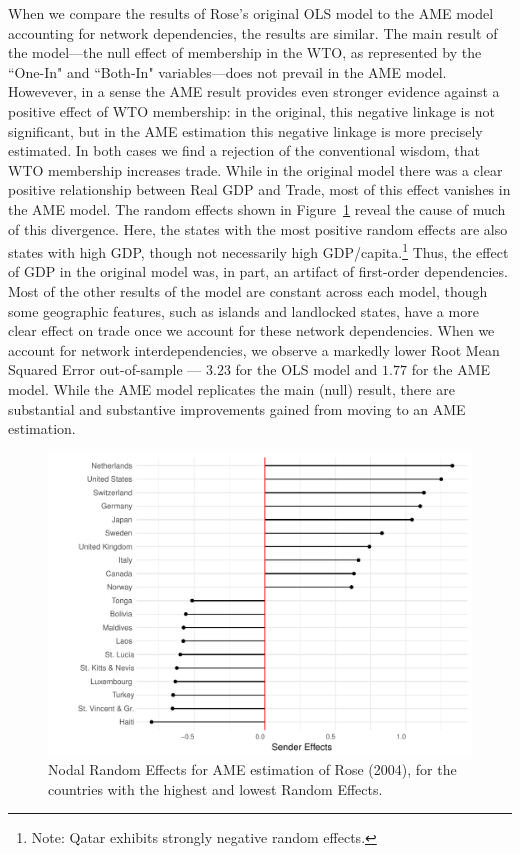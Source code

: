 When we compare the results of Rose's original OLS model to the AME model accounting for network dependencies, the results are similar. The main result of the model---the null effect of membership in the WTO, as represented by the ``One-In" and ``Both-In" variables---does not prevail in the AME model. Howevever, in a sense the AME result provides even stronger evidence against a positive effect of WTO membership: in the original, this negative linkage is not significant, but in the AME estimation this negative linkage is more precisely estimated. In both cases we find  a rejection of the conventional wisdom, that WTO membership increases trade. While in the original model there was a clear positive relationship between Real GDP and Trade, most of this effect vanishes in the AME model. The random effects shown in Figure~\ref{fig:roser} reveal the cause of much of this divergence. Here, the states with the most positive random effects are also states with high GDP, though not necessarily high GDP/capita.\footnote{Note: Qatar exhibits strongly negative random effects.} Thus, the effect of GDP in the original model was, in part, an artifact of first-order dependencies. Most of the other results of the model are constant across each model, though some geographic features, such as islands and landlocked states, have a more clear effect on trade once we account for these network dependencies. When we account for network interdependencies, we observe a markedly lower Root Mean Squared Error out-of-sample --- $3.23$ for the OLS model and $1.77$ for the AME model. While the AME model replicates the main (null) result, there are substantial and substantive improvements gained from moving to an AME estimation.

\begin{figure}
\includegraphics[width=\textwidth]{rose_aeff_top10.pdf}
 \caption{Nodal Random Effects for AME estimation of Rose (2004), for the countries with the highest and lowest Random Effects.}\label{fig:roser}
\end{figure}
\FloatBarrier

